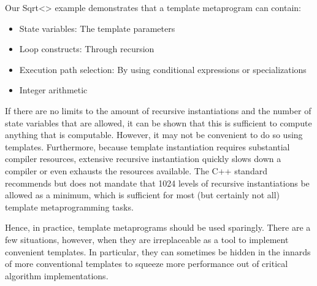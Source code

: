 Our Sqrt<> example demonstrates that a template metaprogram can contain:

\begin{itemize}
\item 
State variables: The template parameters

\item 
Loop constructs: Through recursion

\item 
Execution path selection: By using conditional expressions or specializations

\item 
Integer arithmetic
\end{itemize}

If there are no limits to the amount of recursive instantiations and the number of state variables that are allowed, it can be shown that this is sufficient to compute anything that is computable. However, it may not be convenient to do so using templates. Furthermore, because template instantiation requires substantial compiler resources, extensive recursive instantiation quickly slows down a compiler or even exhausts the resources available. The C++ standard recommends but does not mandate that 1024 levels of recursive instantiations be allowed as a minimum, which is sufficient for most (but certainly not all) template metaprogramming tasks.

Hence, in practice, template metaprograms should be used sparingly. There are a few situations, however, when they are irreplaceable as a tool to implement convenient templates. In particular, they can sometimes be hidden in the innards of more conventional templates to squeeze more performance out of critical algorithm implementations.
















































